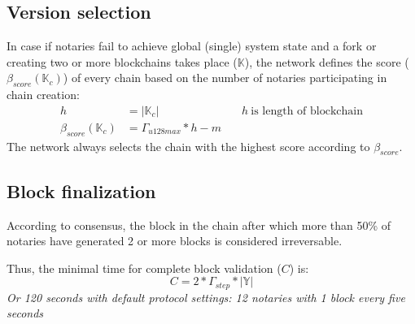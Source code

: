\documentclass[12pt]{report}
\newcommand{\hlc}[1]{\colorbox{yellow!25}{#1}}
\begin{document}
\subsection{Version selection}
\label{tech-blockchain-score}
In case if notaries fail to achieve global (single) system state and a fork or creating two or more blockchains takes place ($\mathbb{K}$), the network defines the score ($\beta_{score}(\mathbb{K}_c)$) of every  chain based on the number of notaries participating in \hlc{chain creation}:	
\begin{align}
h &= |\mathbb{K}_c| & \quad h \ \text{is length of blockchain} \\
\beta_{score}(\mathbb{K}_c) &= \Gamma_{u128max} * h - m
\end{align}
The network always selects the chain with the highest score according to $\beta_{score}$.
\subsection{Block finalization}
\label{tech-blockchain-fin}
According to consensus, the block in the chain after which more than 50\% of notaries have generated 2 or more blocks is considered irreversable.

Thus, the minimal time for complete block validation ($C$) is:
\begin{equation}
C = 2 * \Gamma_{step} * |\mathbb{Y}|
\end{equation}
\textit{Or 120 seconds with default protocol settings: 12 notaries with 1 block every five seconds}
\end{document}
